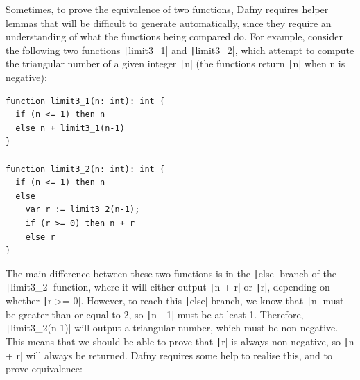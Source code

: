 Sometimes, to prove the equivalence of two functions, Dafny requires helper lemmas that will be difficult to generate automatically, since they require an understanding of what the functions being compared do. For example, consider the following two functions \texttt|limit3_1| and \texttt|limit3_2|, which attempt to compute the triangular number of a given integer \texttt|n| (the functions return \texttt|n| when n is negative):
\begin{verbatim}
function limit3_1(n: int): int {
  if (n <= 1) then n
  else n + limit3_1(n-1)
}

function limit3_2(n: int): int {
  if (n <= 1) then n
  else
    var r := limit3_2(n-1);
    if (r >= 0) then n + r
    else r
}
\end{verbatim}
%
The main difference between these two functions is in the \texttt|else| branch of the \texttt|limit3_2| function, where it will either output \texttt|n + r| or \texttt|r|, depending on whether \texttt|r >= 0|. However, to reach this \texttt|else| branch, we know that \texttt|n| must be greater than or equal to 2, so \texttt|n - 1| must be at least 1. Therefore, \texttt|limit3_2(n-1)| will output a triangular number, which must be non-negative. This means that we should be able to prove that \texttt|r| is always non-negative, so \texttt|n + r| will always be returned. Dafny requires some help to realise this, and to prove equivalence:

